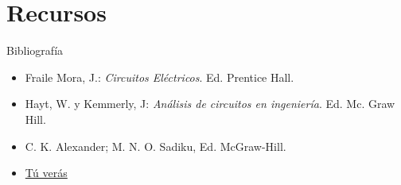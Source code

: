\documentclass[xcolor={usenames,svgnames,dvipsnames}]{beamer}
\begin{document}
\section{Recursos}
\label{sec:orgdb13210}

\begin{frame}[label={sec:org11c94df}]{Bibliografía}
\begin{itemize}
\item \alert{Fraile Mora, J.}: \emph{Circuitos Eléctricos}. Ed. Prentice Hall.

\item \alert{Hayt, W. y Kemmerly, J}: \emph{Análisis de circuitos en ingeniería}. Ed.
Mc. Graw Hill.

\item \alert{C. K. Alexander; M. N. O. Sadiku}, Ed. McGraw-Hill.

\item \href{http://tuveras.com/index.html}{Tú verás}
\end{itemize}
\end{frame}
\end{document}

